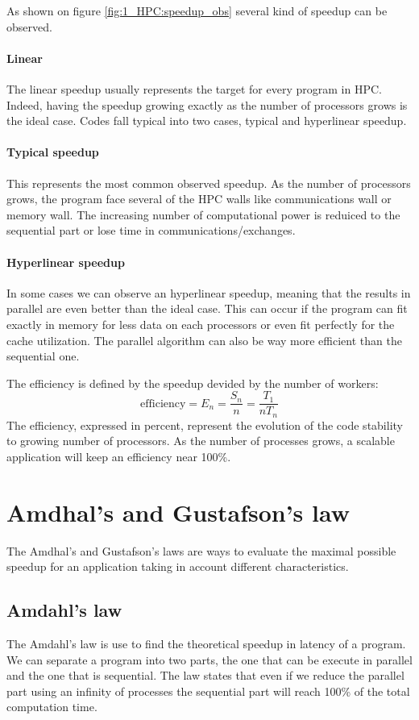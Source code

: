 As shown on figure \ref{fig:1_HPC:speedup_obs} several kind of speedup can be observed. 
\paragraph{Linear}
The linear speedup usually represents the target for every program in HPC. 
Indeed, having the speedup growing exactly as the number of processors grows is the ideal case. 
Codes fall typical into two cases, typical and hyperlinear speedup. 
\paragraph{Typical speedup}
This represents the most common observed speedup. 
As the number of processors grows, the program face several of the HPC walls like communications wall or memory wall. 
The increasing number of computational power is reduiced to the sequential part or lose time in communications/exchanges. 
\paragraph{Hyperlinear speedup}
In some cases we can observe an hyperlinear speedup, meaning that the results in parallel are even better than the ideal case. 
This can occur if the program can fit exactly in memory for less data on each processors or even fit perfectly for the cache utilization. 
The parallel algorithm can also be way more efficient than the sequential one. 

The efficiency is defined by the speedup devided by the number of workers: 
\begin{equation}
\text{efficiency} = E_n = \frac{S_n}{n} = \frac{T_1}{nT_n}
\end{equation}
The efficiency, expressed in percent, represent the evolution of the code stability to growing number of processors. 
As the number of processes grows, a scalable application will keep an efficiency near 100\%.

\section{Amdhal's and Gustafson's law}
The Amdhal's and Gustafson's laws are ways to evaluate the maximal possible speedup for an application taking in account different characteristics. 

\subsection{Amdahl's law}
The Amdahl's law\cite{amdahl1967validity} is use to find the theoretical speedup in latency of a program.
We can separate a program into two parts, the one that can be execute in parallel and the one that is sequential. 
The law states that even if we reduce the parallel part using an infinity of processes the sequential part will reach 100\% of the total computation time. 

